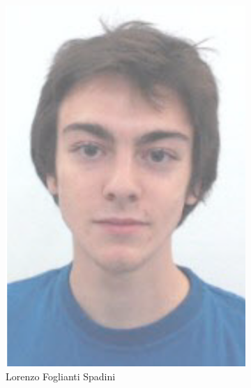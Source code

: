 \begin{figure}
\begin{subfigure}[b]{0.45\textwidth}
        \centering
        \includegraphics[height=0.3\textheight]{Files/LFS}
        \caption{Lorenzo Foglianti Spadini}
    \end{subfigure}\\
    \vspace{0.5cm}
    \begin{subfigure}[b]{0.45\textwidth}
        \centering

\end{subfigure}
\end{figure}
